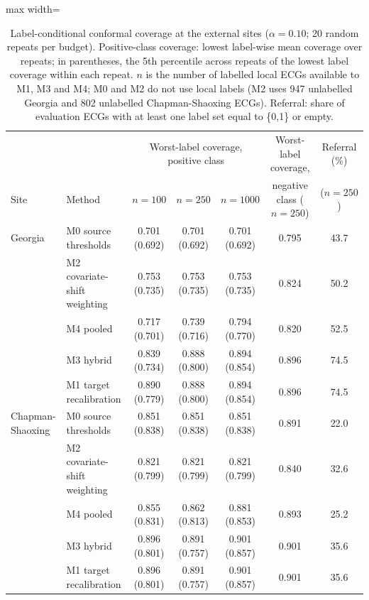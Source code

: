 \begin{table}[!t]
\centering\small
\caption{Label-conditional conformal coverage at the external sites ($\alpha=0.10$; 20 random repeats per budget). Positive-class coverage: lowest label-wise mean coverage over repeats; in parentheses, the 5th percentile across repeats of the lowest label coverage within each repeat. $n$ is the number of labelled local ECGs available to M1, M3 and M4; M0 and M2 do not use local labels (M2 uses 947 unlabelled Georgia and 802 unlabelled Chapman-Shaoxing ECGs). Referral: share of evaluation ECGs with at least one label set equal to \{0,1\} or empty.}
\label{tab:external}
\setlength{\tabcolsep}{4pt}
\begin{adjustbox}{max width=\linewidth}
\begin{tabular}{llccccc}
\toprule
 & & \multicolumn{3}{c}{Worst-label coverage, positive class} & Worst-label coverage, & Referral (\%) \\
Site & Method & $n=100$ & $n=250$ & $n=1000$ & negative class ($n=250$) & ($n=250$) \\
\midrule
Georgia & M0 source thresholds & 0.701 (0.692) & 0.701 (0.692) & 0.701 (0.692) & 0.795 & 43.7 \\
 & M2 covariate-shift weighting & 0.753 (0.735) & 0.753 (0.735) & 0.753 (0.735) & 0.824 & 50.2 \\
 & M4 pooled & 0.717 (0.701) & 0.739 (0.716) & 0.794 (0.770) & 0.820 & 52.5 \\
 & M3 hybrid & 0.839 (0.734) & 0.888 (0.800) & 0.894 (0.854) & 0.896 & 74.5 \\
 & M1 target recalibration & 0.890 (0.779) & 0.888 (0.800) & 0.894 (0.854) & 0.896 & 74.5 \\
\midrule
Chapman-Shaoxing & M0 source thresholds & 0.851 (0.838) & 0.851 (0.838) & 0.851 (0.838) & 0.891 & 22.0 \\
 & M2 covariate-shift weighting & 0.821 (0.799) & 0.821 (0.799) & 0.821 (0.799) & 0.840 & 32.6 \\
 & M4 pooled & 0.855 (0.831) & 0.862 (0.813) & 0.881 (0.853) & 0.893 & 25.2 \\
 & M3 hybrid & 0.896 (0.801) & 0.891 (0.757) & 0.901 (0.857) & 0.901 & 35.6 \\
 & M1 target recalibration & 0.896 (0.801) & 0.891 (0.757) & 0.901 (0.857) & 0.901 & 35.6 \\
\bottomrule
\end{tabular}
\end{adjustbox}
\end{table}
